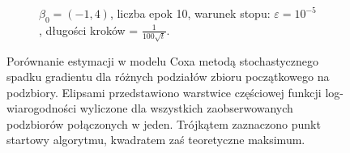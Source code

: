 \begin{figure}[hbt!]
\begin{center}
\begin{subfigure}[h!]{0.9\textwidth}
            \caption{$\beta_0=(-1,4)$, liczba epok 10, warunek stopu: $\varepsilon=10^{-5}$, długości kroków = $\frac{1}{100\sqrt{t}}$.}
   \end{subfigure}  
      \end{center}
  \caption[Porównanie estymacji w modelu Coxa metodą stochastycznego spadku gradientu dla różnych podziałów zbioru początkowego na podzbiory.]{\label{rysCox3}Porównanie estymacji w modelu Coxa metodą stochastycznego spadku gradientu dla różnych podziałów zbioru początkowego na podzbiory. Elipsami przedstawiono warstwice częściowej funkcji log-wiarogodności wyliczone dla wszystkich zaobserwowanych podzbiorów połączonych w jeden. Trójkątem zaznaczono punkt startowy algorytmu, kwadratem zaś teoretyczne maksimum.}
\end{figure}




